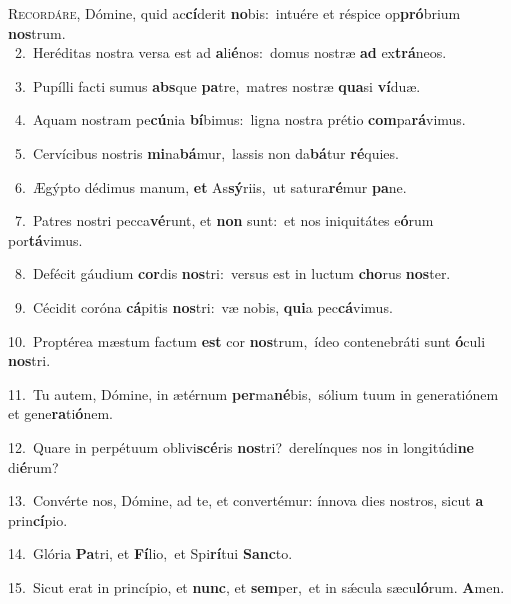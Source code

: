 \lettrine{\initial\textcolor{\initialcolor}{R}}{ecordáre,} Dómine, quid ac\-\textbf{cí}\-derit \textbf{no}\-bis:~\star intuére et réspice op\-\textbf{pró}\-brium \textbf{nos}\-trum.\\
{\numbfont\textcolor{\numbcolor}{~2.}}~Heréditas nostra versa est ad \textbf{a}\-li\-\textbf{é}\-nos:~\star domus nostræ \textbf{ad} ex\-\textbf{trá}\-neos.\par
{\numbfont\textcolor{\numbcolor}{~3.}}~Pupílli facti sumus \textbf{abs}\-que \textbf{pa}\-tre,~\star matres nostræ \textbf{qua}\-si \textbf{ví}\-duæ.\par
{\numbfont\textcolor{\numbcolor}{~4.}}~Aquam nostram pe\-\textbf{cú}\-nia \textbf{bí}\-bimus:~\star ligna nostra prétio \textbf{com}\-pa\-\textbf{rá}\-vimus.\par
{\numbfont\textcolor{\numbcolor}{~5.}}~Cervícibus nostris \textbf{mi}\-na\-\textbf{bá}\-mur,~\star lassis non da\-\textbf{bá}\-tur \textbf{ré}\-quies.\par
{\numbfont\textcolor{\numbcolor}{~6.}}~Ægýpto dédimus manum, \textbf{et} As\-\textbf{sý}\-riis,~\star ut satura\-\textbf{ré}\-mur \textbf{pa}\-ne.\par
{\numbfont\textcolor{\numbcolor}{~7.}}~Patres nostri pecca\-\textbf{vé}\-runt, et \textbf{non} sunt:~\star et nos iniquitátes e\-\textbf{ó}\-rum por\-\textbf{tá}\-vimus.\par
{\numbfont\textcolor{\numbcolor}{~8.}}~Defécit gáudium \textbf{cor}\-dis \textbf{nos}\-tri:~\star versus est in luctum \textbf{cho}\-rus \textbf{nos}\-ter.\par
{\numbfont\textcolor{\numbcolor}{~9.}}~Cécidit coróna \textbf{cá}\-pitis \textbf{nos}\-tri:~\star væ nobis, \textbf{qui}\-a pec\-\textbf{cá}\-vimus.\par
{\numbfont\textcolor{\numbcolor}{10.}}~Proptérea mæstum factum \textbf{est} cor \textbf{nos}\-trum,~\star ídeo contenebráti sunt \textbf{ó}\-culi \textbf{nos}\-tri.\par
{\numbfont\textcolor{\numbcolor}{11.}}~Tu autem, Dómine, in ætérnum \textbf{per}\-ma\-\textbf{né}\-bis,~\star sólium tuum in generatiónem et gene\-\textbf{ra}\-ti\-\textbf{ó}\-nem.\par
{\numbfont\textcolor{\numbcolor}{12.}}~Quare in perpétuum oblivi\-\textbf{scé}\-ris \textbf{nos}\-tri?~\star derelínques nos in longitúdi\textbf{ne} di\-\textbf{é}\-rum?\par
{\numbfont\textcolor{\numbcolor}{13.}}~Convérte nos, Dómine, ad te, et convertémur: ínnova dies nostros, sicut \textbf{a} prin\-\textbf{cí}\-pio.\par
{\numbfont\textcolor{\numbcolor}{14.}}~Glória \textbf{Pa}\-tri, et \textbf{Fí}\-lio,~\star et Spi\-\textbf{rí}\-tui \textbf{Sanc}\-to.\par
{\numbfont\textcolor{\numbcolor}{15.}}~Sicut erat in princípio, et \textbf{nunc}\-, et \textbf{sem}\-per,~\star et in sǽcula sæcu\-\textbf{ló}\-rum. \textbf{A}\-men.\par
